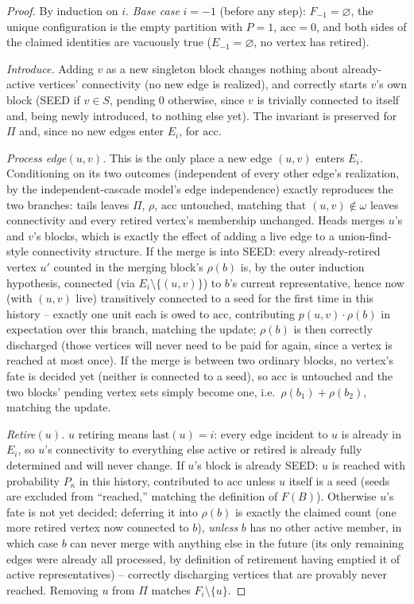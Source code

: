\documentclass[preprint,11pt]{elsarticle}
\theoremstyle{definition}
\theoremstyle{remark}
\newcommand{\FF}{F}
\begin{document}
\begin{proof}
By induction on $i$. \emph{Base case} $i=-1$ (before any step): $F_{-1}
=\varnothing$, the unique configuration is the empty partition with $P=1$,
$\mathrm{acc}=0$, and both sides of the claimed identities are vacuously
true ($E_{-1}=\varnothing$, no vertex has retired).

\emph{Introduce.} Adding $v$ as a new singleton block changes nothing about
already-active vertices' connectivity (no new edge is realized), and
correctly starts $v$'s own block (SEED if $v\in S$, pending $0$ otherwise,
since $v$ is trivially connected to itself and, being newly introduced, to
nothing else yet). The invariant is preserved for $\Pi$ and, since no new
edges enter $E_i$, for $\mathrm{acc}$.

\emph{Process edge$(u,v)$.} This is the only place a new edge $(u,v)$
enters $E_i$. Conditioning on its two outcomes (independent of every other
edge's realization, by the independent-cascade model's edge independence)
exactly reproduces the two branches: tails leaves $\Pi$, $\rho$,
$\mathrm{acc}$ untouched, matching that $(u,v)\notin\omega$ leaves
connectivity and every retired vertex's membership unchanged. Heads merges
$u$'s and $v$'s blocks, which is exactly the effect of adding a live edge to
a union-find-style connectivity structure. If the merge is into SEED: every
already-retired vertex $u'$ counted in the merging block's $\rho(b)$ is, by
the outer induction hypothesis, connected (via $E_i\setminus\{(u,v)\}$) to
$b$'s current representative, hence now (with $(u,v)$ live) transitively
connected to a seed for the first time in this history -- exactly one unit
each is owed to $\mathrm{acc}$, contributing $p(u,v)\cdot\rho(b)$ in
expectation over this branch, matching the update; $\rho(b)$ is then
correctly discharged (those vertices will never need to be paid for again,
since a vertex is reached at most once). If the merge is between two
ordinary blocks, no vertex's fate is decided yet (neither is connected to a
seed), so $\mathrm{acc}$ is untouched and the two blocks' pending vertex
sets simply become one, i.e.\ $\rho(b_1)+\rho(b_2)$, matching the update.

\emph{Retire$(u)$.} $u$ retiring means $\mathrm{last}(u)=i$: every edge
incident to $u$ is already in $E_i$, so $u$'s connectivity to everything
else active or retired is already fully determined and will never change.
If $u$'s block is already SEED: $u$ is reached with probability $P_\kappa$
in this history, contributed to $\mathrm{acc}$ unless $u$ itself is a seed
(seeds are excluded from ``reached,'' matching the definition of
$\FF(B)$). Otherwise $u$'s fate is not yet decided; deferring it into
$\rho(b)$ is exactly the claimed count (one more retired vertex now
connected to $b$), \emph{unless} $b$ has no other active member, in which
case $b$ can never merge with anything else in the future (its only
remaining edges were already all processed, by definition of retirement
having emptied it of active representatives) -- correctly discharging
vertices that are provably never reached. Removing $u$ from $\Pi$ matches
$F_i\setminus\{u\}$.
\end{proof}
\end{document}
